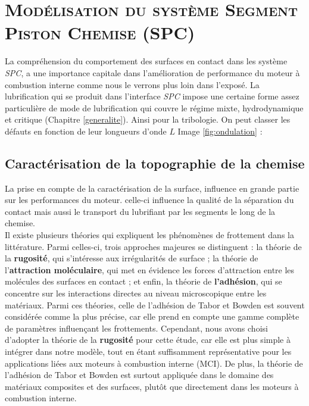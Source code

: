 \chapter{\textsc{Modélisation du système Segment Piston Chemise (SPC)}}\label{Modelisation}
La compréhension du comportement des surfaces en contact dans les système \emph{SPC}, a une importance capitale dans l'amélioration de performance du moteur à combustion interne comme nous le verrons plus loin dans l'exposé. La lubrification qui se produit dans l'interface \emph{SPC} impose une certaine forme assez particulière de mode de lubrification qui couvre le régime mixte, hydrodynamique et critique (Chapitre \ref{generalite}). Ainsi pour la tribologie. On peut classer les défauts en fonction de leur longueurs d’onde $L$ Image \ref{fig:ondulation}  \cite{initiation} :

\section{Caractérisation de la topographie de la chemise}
La prise en compte de la caractérisation de la surface, influence en grande partie sur les performances du moteur. celle-ci influence la qualité de la séparation du contact mais aussi le transport du lubrifiant par les segments le long de la chemise.\\

Il existe plusieurs théories qui expliquent les phénomènes de frottement dans la littérature. Parmi celles-ci, trois approches majeures se distinguent : la théorie de la \textbf{rugosité}, qui s'intéresse aux irrégularités de surface ; la théorie de l'\textbf{attraction moléculaire}, qui met en évidence les forces d'attraction entre les molécules des surfaces en contact ; et enfin, la théorie de \textbf{l'adhésion}, qui se concentre sur les interactions directes au niveau microscopique entre les matériaux. Parmi ces théories, celle de l'adhésion de Tabor et Bowden est souvent considérée comme la plus précise, car elle prend en compte une gamme complète de paramètres influençant les frottements. Cependant, nous avons choisi d'adopter la théorie de la \textbf{rugosité} pour cette étude, car elle est plus simple à intégrer dans notre modèle, tout en étant suffisamment représentative pour les applications liées aux moteurs à combustion interne (MCI). De plus, la théorie de l'adhésion de Tabor et Bowden est surtout appliquée dans le domaine des matériaux composites et des surfaces, plutôt que directement dans les moteurs à combustion interne.\\

